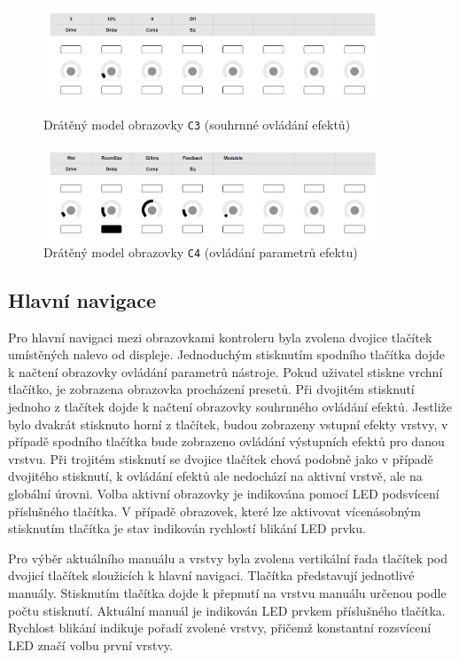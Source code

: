 \documentclass[thesis=M,czech]{FITthesis}[2019/03/06]
\begin{document}
		\begin{figure}
			\centering
			\includegraphics[width=0.9\textwidth]{ControllerUI-EffectOverview}
			\caption{Drátěný model obrazovky \texttt{C3} (souhrnné ovládání efektů)}
			\label{fig:ControllerUI-EffectOverview}			
			\vspace{1.2cm}
			\includegraphics[width=0.9\textwidth]{ControllerUI-EffectDetail}
			\caption{Drátěný model obrazovky \texttt{C4} (ovládání parametrů efektu)}
			\label{fig:ControllerUI-EffectDetail}
		\end{figure}
	
		\subsection{Hlavní navigace}\label{sec:controller-navigation-design}
			Pro hlavní navigaci mezi obrazovkami kontroleru byla zvolena dvojice tlačítek umístěných nalevo od displeje.
			Jednoduchým stisknutím spodního tlačítka dojde k načtení obrazovky ovládání parametrů nástroje.
			Pokud uživatel stiskne vrchní tlačítko, je zobrazena obrazovka procházení presetů.
			Při dvojitém stisknutí jednoho z tlačítek dojde k načtení obrazovky souhrnného ovládání efektů.
			Jestliže bylo dvakrát stisknuto horní z tlačítek, budou zobrazeny vstupní efekty vrstvy, v případě spodního
			tlačítka bude zobrazeno ovládání výstupních efektů pro danou vrstvu.
			Při trojitém stisknutí se dvojice tlačítek chová podobně jako v případě dvojitého stisknutí,
			k ovládání efektů ale nedochází na aktivní vrstvě, ale na globální úrovni.
			Volba aktivní obrazovky je indikována pomocí LED podsvícení příslušného tlačítka. V případě obrazovek,
			které lze aktivovat vícenásobným stisknutím tlačítka je stav indikován rychlostí blikání LED prvku.			
		
			Pro výběr aktuálního manuálu a vrstvy byla zvolena vertikální řada tlačítek pod dvojicí tlačítek sloužicích k hlavní navigaci.
			Tlačítka představují jednotlivé manuály. Stisknutím tlačítka dojde k přepnutí na vrstvu manuálu určenou podle počtu stisknutí.
			Aktuální manuál je indikován LED prvkem příslušného tlačítka. Rychlost blikání indikuje pořadí zvolené vrstvy, přičemž
			konstantní rozsvícení LED značí volbu první vrstvy.
\end{document}
